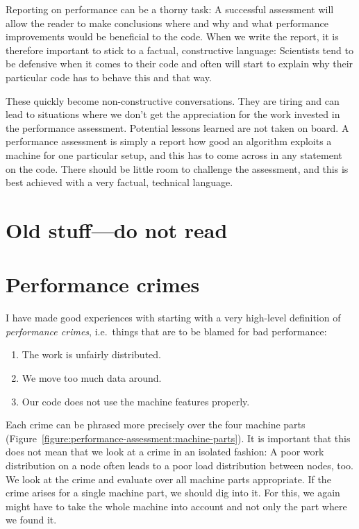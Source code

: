 Reporting on performance can be a thorny task: 
A successful assessment will allow the reader to make conclusions where and why
and what performance improvements would be beneficial to the code. When we write the report, it
is therefore important to stick to a factual, constructive language: Scientists
tend to be defensive when it comes to their code and often will start to explain why their particular code
has to behave this and that way.



These quickly become non-constructive conversations.
They are tiring and can lead to situations where we don't get the appreciation
for the work invested in the performance assessment.
Potential lessons learned are not taken on board. 
A performance assessment is simply a report how good an algorithm exploits a
machine for one particular setup, and this has to come across in any statement
on the code.
There should be little room to challenge the assessment, and this is best
achieved with a very factual, technical language.




 

\section{Old stuff---do not read}

\section{Performance crimes}


I have made good experiences with starting with a very high-level definition of
\emph{performance crimes}, i.e.~things that are to be blamed for bad
performance:

\begin{enumerate}
  \item The work is unfairly distributed.
  \item We move too much data around. 
  \item Our code does not use the machine features properly.
\end{enumerate}


\noindent
Each crime can be phrased more precisely over the four machine parts
(Figure~\ref{figure:performance-assessment:machine-parts}).
It is important that this does not mean that we look at a crime in an isolated
fashion: A poor work distribution on a node often leads to a poor load
distribution between nodes, too.
We look at the crime and evaluate over all machine parts appropriate.
If the crime arises for a single machine part, we should dig into it.
For this, we again might have to take the whole machine into account and not
only the part where we found it. 



